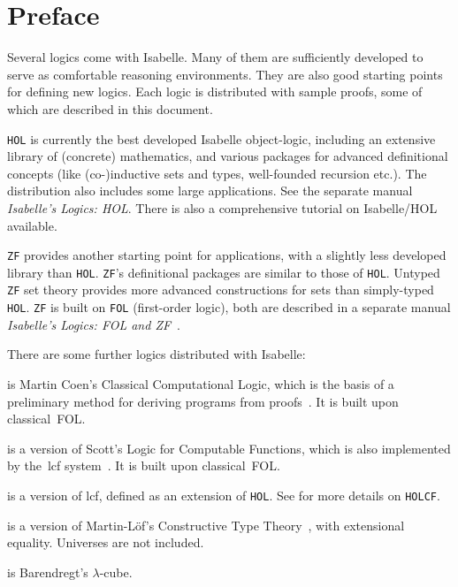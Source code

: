 \chapter*{Preface}
Several logics come with Isabelle.  Many of them are sufficiently developed
to serve as comfortable reasoning environments.  They are also good
starting points for defining new logics.  Each logic is distributed with
sample proofs, some of which are described in this document.

\texttt{HOL} is currently the best developed Isabelle object-logic, including
an extensive library of (concrete) mathematics, and various packages for
advanced definitional concepts (like (co-)inductive sets and types,
well-founded recursion etc.). The distribution also includes some large
applications.  See the separate manual \emph{Isabelle's Logics: HOL}.  There
is also a comprehensive tutorial on Isabelle/HOL available.

\texttt{ZF} provides another starting point for applications, with a slightly
less developed library than \texttt{HOL}.  \texttt{ZF}'s definitional packages
are similar to those of \texttt{HOL}. Untyped \texttt{ZF} set theory provides
more advanced constructions for sets than simply-typed \texttt{HOL}.
\texttt{ZF} is built on \texttt{FOL} (first-order logic), both are described
in a separate manual \emph{Isabelle's Logics: FOL and ZF}~\cite{isabelle-ZF}.

\medskip There are some further logics distributed with Isabelle:
\begin{ttdescription}
\item[\thydx{CCL}] is Martin Coen's Classical Computational Logic,
  which is the basis of a preliminary method for deriving programs from
  proofs~\cite{coen92}.  It is built upon classical~FOL.
 
\item[\thydx{LCF}] is a version of Scott's Logic for Computable
  Functions, which is also implemented by the~{\sc lcf}
  system~\cite{paulson87}.  It is built upon classical~FOL.
  
\item[\thydx{HOLCF}] is a version of {\sc lcf}, defined as an extension of
  \texttt{HOL}\@. See \cite{MuellerNvOS99} for more details on \texttt{HOLCF}.
 
\item[\thydx{CTT}] is a version of Martin-L\"of's Constructive Type
Theory~\cite{nordstrom90}, with extensional equality.  Universes are not
included.

\item[\thydx{Cube}] is Barendregt's $\lambda$-cube.
 \end{ttdescription}

